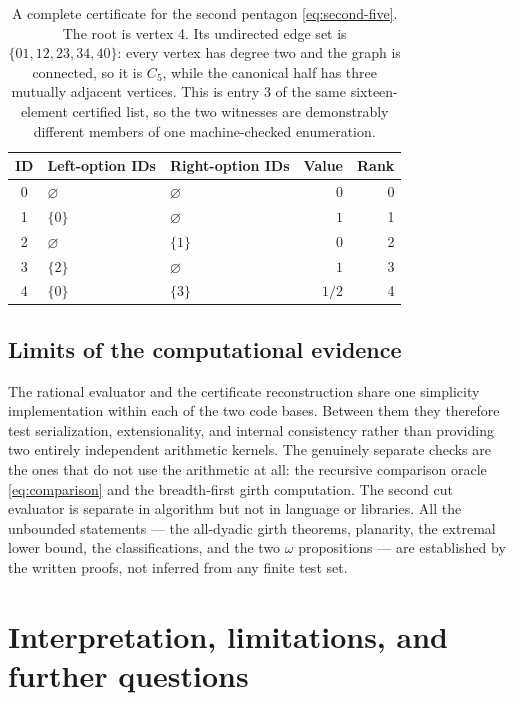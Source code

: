 \documentclass[11pt,a4paper]{article}
\numberwithin{equation}{section}
\theoremstyle{definition}
\theoremstyle{remark}
\begin{document}
\begin{table}[htbp]
\centering
\begin{tabular}{@{}cllrr@{}}
\toprule
ID & Left-option IDs & Right-option IDs & Value & Rank\\
\midrule
0 & $\varnothing$ & $\varnothing$ & $0$ &0\\
1 & $\{0\}$ & $\varnothing$ & $1$ &1\\
2 & $\varnothing$ & $\{1\}$ & $0$ &2\\
3 & $\{2\}$ & $\varnothing$ & $1$ &3\\
4 & $\{0\}$ & $\{3\}$ & $1/2$ &4\\
\bottomrule
\end{tabular}
\caption{A complete certificate for the second pentagon
\eqref{eq:second-five}. The root is vertex 4. Its undirected edge set is
$\{01,12,23,34,40\}$: every vertex has degree two and the graph is connected, so
it is $C_5$, while the canonical half has three mutually adjacent vertices. This
is entry $3$ of the same sixteen-element certified list, so the two witnesses are
demonstrably different members of one machine-checked enumeration.}
\label{tab:certificate-two}
\end{table}

\subsection{Limits of the computational evidence}

The rational evaluator and the certificate reconstruction share one simplicity
implementation within each of the two code bases. Between them they therefore
test serialization, extensionality, and internal consistency rather than
providing two entirely independent arithmetic kernels. The genuinely separate
checks are the ones that do not use the arithmetic at all: the recursive
comparison oracle \eqref{eq:comparison} and the breadth-first girth computation.
The second cut evaluator is separate in algorithm but not in language or
libraries. All the unbounded statements --- the all-dyadic girth theorems,
planarity, the extremal lower bound, the classifications, and the two $\omega$
propositions --- are established by the written proofs, not inferred from any
finite test set.

\section{Interpretation, limitations, and further questions}
\label{sec:discussion}
\end{document}
